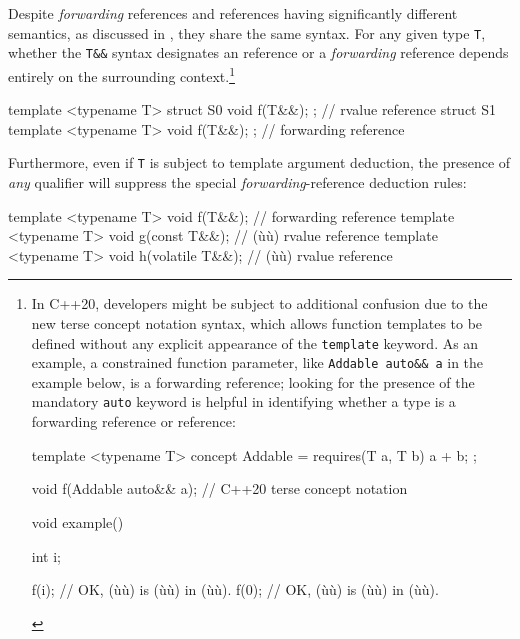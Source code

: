 Despite \emph{forwarding} references and 
references having significantly different semantics, as discussed in ,
they share the same syntax. For any given type \lstinline!T!,
whether the \lstinline!T&&! syntax designates an 
reference or a \emph{forwarding} reference depends entirely on the
surrounding context.{\cprotect\footnote{In C++20, developers might be
subject to additional confusion due to the new terse concept notation
syntax, which allows function templates to be defined without any
explicit appearance of the \lstinline!template! keyword. As an example, a
constrained function parameter, like
\lstinline!Addable!~\lstinline!auto&&!~\lstinline!a! in the example below, is a forwarding
reference; looking for the presence of the mandatory \lstinline!auto!
keyword is helpful in identifying whether a type is a forwarding
reference or  reference:

\begin{emcppslisting}[emcppsstandards=c++20,style=footcode]
template <typename T>
concept Addable = requires(T a, T b) { a + b; };

void f(Addable auto&& a);  // C++20 terse concept notation

void example()
{
    int i;

    f(i);  // OK, (ù{}ù) is (ù{}ù) in (ù{}ù).
    f(0);  // OK, (ù{}ù) is (ù{}ù) in (ù{}ù).
}
\end{emcppslisting}
      }}

\begin{emcppslisting}
template <typename T> struct S0 { void f(T&&); };  // rvalue reference
struct S1 { template <typename T> void f(T&&); };  // forwarding reference
\end{emcppslisting}

\noindent Furthermore, even if \lstinline!T! is subject to template argument
deduction, the presence of \emph{any} qualifier will suppress the
special \emph{forwarding}-reference deduction rules:

\begin{emcppslisting}
template <typename T> void f(T&&);           // forwarding reference
template <typename T> void g(const T&&);     // (ù{}ù) rvalue reference
template <typename T> void h(volatile T&&);  // (ù{}ù) rvalue reference
\end{emcppslisting}

